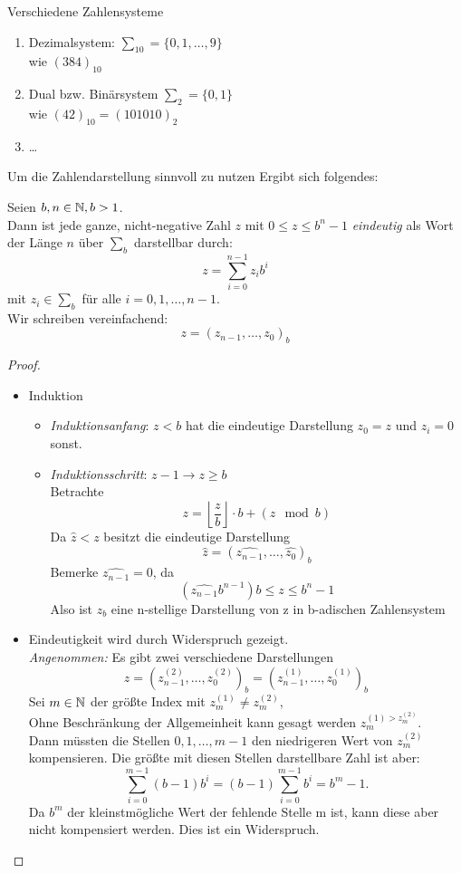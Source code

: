 \begin{example}
Verschiedene Zahlensysteme
\begin{enumerate}
	\item Dezimalsystem: $\sum_{10}= \{0,1,\ldots,9\}$ \\ wie $(384)_10$
	\item Dual bzw. Binärsystem $\sum_2 = \{0,1\}$ \\ wie $(42)_10 = (101010)_2$
	\item \ldots
\end{enumerate}
\end{example}
Um die Zahlendarstellung sinnvoll zu nutzen Ergibt sich folgendes:
\begin{theorem}[]
Seien $b,n \in  \mathbb{N}, b>1 $. \\
Dann ist jede ganze, nicht-negative Zahl $z$ mit $0\le z \le b^{n}-1$ \emph{eindeutig} als Wort der Länge $n$ über $\sum_b$ darstellbar durch:
\[
z=\sum_{i=0}^{n-1}z_ib^{i}
\]
mit $z_i \in \sum_b$ für alle $i=0,1,\ldots,n-1$. \\
Wir schreiben vereinfachend: 
\[
z=(z_{n-1},\ldots, z_0)_b
\]
\end{theorem}
\begin{proof}

\begin{itemize}
\item Induktion \medskip
\begin{itemize}[label=$\lozenge$, itemsep=2ex]
\item \emph{Induktionsanfang}: \underline{$z<b$} hat die eindeutige Darstellung $z_0=z$ und $z_i=0$ sonst.



\item \emph{Induktionsschritt}: \underline{$z-1 \to z\ge b$} \\   

Betrachte
\[
z= \left\lfloor{\frac{z}{b}}\right\rfloor \cdot b + (z \mod b)
\]
Da $\hat{z}<z$ besitzt die eindeutige Darstellung
\[
\hat{z}= (\hat{z_{n-1}},\ldots, \hat{z_0})_b
\]
Bemerke $\hat{z_{n-1}}=0$, da 
\[
\left( \hat{z_{n-1}}b^{n-1} \right)b \le z \le b^{n}-1
\]
Also ist $z_b$ eine n-stellige Darstellung von z in b-adischen Zahlensystem

\end{itemize}

\item Eindeutigkeit wird durch Widerspruch gezeigt. \\
\emph{Angenommen:} Es gibt zwei verschiedene Darstellungen
\[
z=\left( z_{n-1}^{(2)},\ldots, z_0^{(2)} \right)_b = \left(z_{n-1}^{(1)},\ldots,z_0^{(1)} \right)_b
\]
Sei $m \in  \mathbb{N}$ der größte Index mit $z_m^{(1)} \neq z_m^{(2)}$, \\
Ohne Beschränkung der Allgemeinheit kann gesagt werden $z_m^{(1)>z_m^{(2)}}$. \\
Dann müssten die Stellen $0,1,\ldots,m-1$ den niedrigeren Wert von $z_m^{(2)}$ kompensieren. Die größte mit diesen Stellen darstellbare Zahl ist aber:
\[
\sum_{i=0}^{m-1}(b-1)b^{i}= (b-1)\sum_{i=0}^{m-1}b^{i}= b^{m}-1 \text{.}
\]
Da $b^{m}$ der kleinstmögliche Wert der fehlende Stelle m ist, kann diese aber nicht kompensiert werden. Dies ist ein Widerspruch.
\end{itemize}
\end{proof}%
